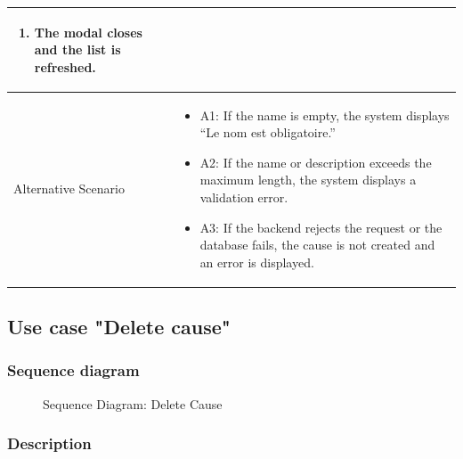 {\begin{longtable}{|p{}|p{}|}
\begin{enumerate}
\item The modal closes and the list is refreshed.
\end{enumerate} \\ \hline
Alternative Scenario &
\begin{itemize}
\item A1: If the name is empty, the system displays ``Le nom est obligatoire.''
\item A2: If the name or description exceeds the maximum length, the system displays a validation error.
\item A3: If the backend rejects the request or the database fails, the cause is not created and an error is displayed.
\end{itemize} \\ \hline
\end{longtable}
}

\subsection{Use case "Delete cause"}

\subsubsection{Sequence diagram}

\begin{figure}[H]
\centering
{}
\caption{Sequence Diagram: Delete Cause}
\label{fig:chapter2-delete-cause}
\end{figure}

\subsubsection{Description}

